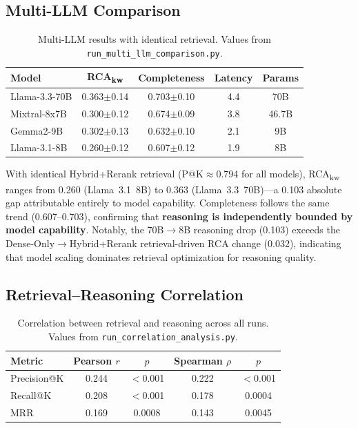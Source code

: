 \documentclass[11pt,a4paper]{article}
\begin{document}
\subsection{Multi-LLM Comparison}
\label{sec:multi-llm}

\begin{table}[h]
\centering
\small
\caption{Multi-LLM results with identical retrieval.
Values from \texttt{run\_multi\_llm\_comparison.py}.}
\label{tab:multi-llm}
\begin{tabular}{lcccc}
\toprule
\textbf{Model} & \textbf{RCA\textsubscript{kw}} & \textbf{Completeness} & \textbf{Latency} & \textbf{Params} \\
\midrule
Llama-3.3-70B        & 0.363$\pm$0.14 & 0.703$\pm$0.10 & 4.4 & 70B \\
Mixtral-8x7B         & 0.300$\pm$0.12 & 0.674$\pm$0.09 & 3.8 & 46.7B \\
Gemma2-9B            & 0.302$\pm$0.13 & 0.632$\pm$0.10 & 2.1 & 9B \\
Llama-3.1-8B         & 0.260$\pm$0.12 & 0.607$\pm$0.12 & 1.9 & 8B \\
\bottomrule
\end{tabular}
\end{table}

With identical Hybrid+Rerank retrieval (P@K$\approx$0.794 for all
models), RCA\textsubscript{kw} ranges from 0.260 (Llama~3.1~8B) to
0.363 (Llama~3.3~70B)---a 0.103 absolute gap attributable entirely
to model capability.
Completeness follows the same trend (0.607--0.703), confirming that
\textbf{reasoning is independently bounded by model capability}.
Notably, the 70B$\to$8B reasoning drop (0.103) exceeds the
Dense-Only$\to$Hybrid+Rerank retrieval-driven RCA change (0.032),
indicating that model scaling dominates retrieval optimization for
reasoning quality.

\subsection{Retrieval--Reasoning Correlation}

\begin{table}[h]
\centering
\small
\caption{Correlation between retrieval and reasoning across all runs.
Values from \texttt{run\_correlation\_analysis.py}.}
\label{tab:correlation}
\begin{tabular}{lcccc}
\toprule
\textbf{Metric} & \textbf{Pearson $r$} & \textbf{$p$} & \textbf{Spearman $\rho$} & \textbf{$p$} \\
\midrule
Precision@K  & 0.244 & $<$0.001 & 0.222 & $<$0.001 \\
Recall@K     & 0.208 & $<$0.001 & 0.178 & 0.0004 \\
MRR          & 0.169 & 0.0008 & 0.143 & 0.0045 \\
\bottomrule
\end{tabular}
\end{table}
\end{document}
